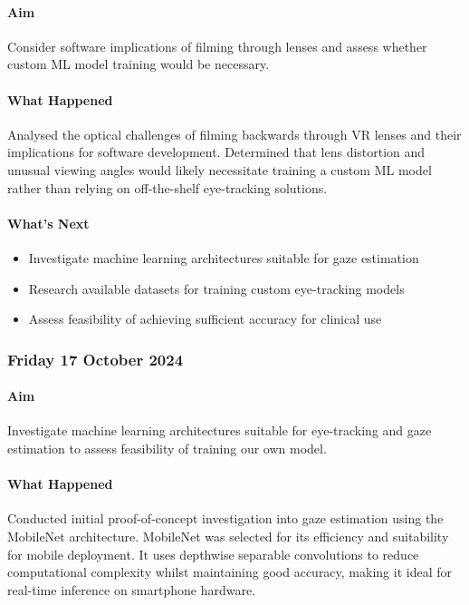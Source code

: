 \paragraph{Aim}
Consider software implications of filming through lenses and assess whether custom ML model training would be necessary.

\paragraph{What Happened}
Analysed the optical challenges of filming backwards through VR lenses and their implications for software development. Determined that lens distortion and unusual viewing angles would likely necessitate training a custom ML model rather than relying on off-the-shelf eye-tracking solutions.

\paragraph{What's Next}
\begin{itemize}
    \item Investigate machine learning architectures suitable for gaze estimation
    \item Research available datasets for training custom eye-tracking models
    \item Assess feasibility of achieving sufficient accuracy for clinical use
\end{itemize}

\subsubsection*{Friday 17 October 2024}

\paragraph{Aim}
Investigate machine learning architectures suitable for eye-tracking and gaze estimation to assess feasibility of training our own model.

\paragraph{What Happened}
Conducted initial proof-of-concept investigation into gaze estimation using the MobileNet architecture. MobileNet was selected for its efficiency and suitability for mobile deployment. It uses depthwise separable convolutions to reduce computational complexity whilst maintaining good accuracy, making it ideal for real-time inference on smartphone hardware.

